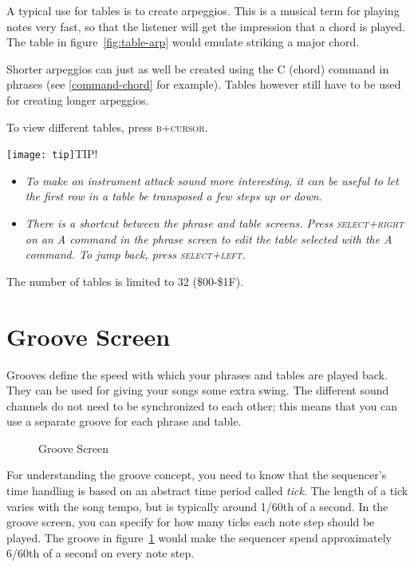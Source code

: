 A typical use for tables is to create arpeggios. This is a musical term for playing notes very fast, so that the listener will get the impression that a chord is played. The table in figure~\ref{fig:table-arp} would emulate striking a major chord.

Shorter arpeggios can just as well be created using the C (chord) command in phrases (see \ref{command-chord} for example). Tables however still have to be used for creating longer arpeggios.

To view different tables, press \textsc{b+cursor}.

\texttt{[image: tip]}TIP!
\begin{itemize}
	\item \textit{To make an instrument attack sound more interesting, it can be useful to let the first row in a table be transposed a few steps up or down.}
	\item \textit{There is a shortcut between the phrase and table screens. Press \textsc{select+right} on an A command in the phrase screen to edit the table selected with the A command. To jump back, press \textsc{select+left}.}
\end{itemize}

The number of tables is limited to 32 (\$00-\$1F).

\section{Groove Screen}

Grooves define the speed with which your phrases and tables are played back. They can be used for giving your songs some extra swing. The different sound channels do not need to be synchronized to each other; this means that you can use a separate groove for each phrase and table.

\begin{figure}[htbp]
	\begin{center}
	\end{center}
	\caption{Groove Screen}
	\label{fig:groove}
\end{figure}

For understanding the groove concept, you need to know that the sequencer's time handling is based on an abstract time period called \emph{tick}. The length of a tick varies with the song tempo, but is typically around 1/60th of a second. In the groove screen, you can specify for how many ticks each note step should be played.
The groove in figure~\ref{fig:groove} would make the sequencer spend approximately 6/60th of a second on every note step.

